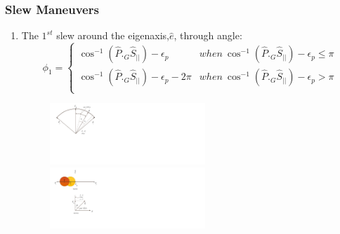 \documentclass[letterpaper, preprint, paper,11pt]{AAS}	%
\begin{document}
		
		\subsubsection{Slew Maneuvers}
		
			\begin{enumerate}
				\item The $1^{st}$ slew around the eigenaxis,$\hat{e}$, through angle:
			\begin{equation}
				\phi_1=\left\{
				\begin{array}{ll}
				\cos^{-1}(\hat{P}._G\hat{S}_{||})-\epsilon_p& when\  \cos^{-1}(\hat{P}._G\hat{S}_{||})-\epsilon_p\leq \pi\\
				\cos^{-1}(\hat{P}._G\hat{S}_{||})-\epsilon_p-2\pi& when\ \cos^{-1}(\hat{P}._G\hat{S}_{||})-\epsilon_p>\pi\\
				\end{array}
				\right.
			\end{equation}
			\begin{figure}[htb]
				\begin{center}
				\includegraphics[width=2.3in]{./Figures/SVAS_1r}\includegraphics[width=2.3in]{./Figures/SVAS_1rb}
				\end{center}
			\end{figure}
		
		

\end{enumerate}
\end{document}
